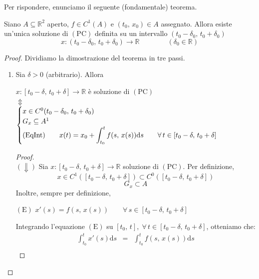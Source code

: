 Per rispondere, enunciamo il seguente (fondamentale) teorema.

\begin{thm}
Siano $A \subseteq \mathbb{R}^2$ aperto, $f \in C^1(A)$ e $(t_0,\,x_0) \in A$ assegnato. Allora esiste un'unica soluzione di $\mathrm{(PC)}$ definita su un intervallo $(t_0-\delta_0,\,t_0+\delta_0)$
$$
x : (t_0-\delta_0,\,t_0+\delta_0) \longrightarrow \mathbb{R} \qquad\qquad (\delta_0 \in \mathbb{R})
$$
\end{thm}
\begin{proof}
Dividiamo la dimostrazione del teorema in tre passi.
\begin{enumerate}[labelindent=\parindent,leftmargin=*,label=\textnormal{\underline{Passo \arabic*}.},start=1]
	\item Sia $\delta > 0$ (arbitrario). Allora 
	\begin{center}
	$x:[t_0-\delta,\,t_0+\delta] \longrightarrow \mathbb{R}$ è soluzione di $\mathrm{(PC)}$\\
	$\Updownarrow$\\
	$
	\begin{cases}
	x \in C^0(t_0-\delta_0,\,t_0+\delta_0)\\
	G_x \subseteq A\footnotemark\\
	\mathrm{(EqInt)} \qquad \displaystyle x(t) = x_0 + \int_{t_0}^t f(s,\,x(s)) \mathrm{d}s & \quad \forall \, t \in [t_0-\delta,\,t_0+\delta]
	\end{cases}
	$
	\end{center}
	\begin{proof}\mbox{}\\
	$(\Downarrow)$ Sia $x:[t_0-\delta,\,t_0+\delta] \longrightarrow \mathbb{R}$ soluzione di $\mathrm{(PC)}$. Per definizione,
	$$
	x \in C^1([t_0-\delta,\,t_0+\delta]) \subset C^0([t_0-\delta,\,t_0+\delta])
	$$
	$$
	G_x \subset A
	$$
	Inoltre, sempre per definizione,
	\begin{center}
	$\mathrm{(E)}$
	\hfill
	$\displaystyle
	x'(s) = f(s,\,x(s)) \qquad \forall \, s \in [t_0-\delta,\,t_0+\delta]
	$
	\hfill \null \\
	\end{center}
	Integrando l'equazione $\mathrm{(E)}$ su $[t_0,\,t], \; \forall \, t \in [t_0-\delta,\,t_0+\delta]$, otteniamo che:
	$$
	\begin{array}{ccc}
	\displaystyle \int_{t_0}^t x'(s) \mathrm{d}s &=& \displaystyle \int_{t_0}^t f(s,\,x(s)) \mathrm{d}s\\

\end{array}$$
\end{proof}
\end{enumerate}
\end{proof}
